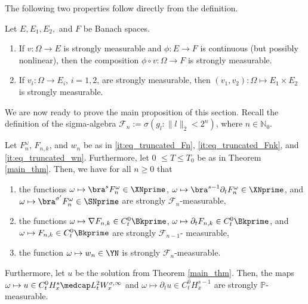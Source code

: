 \documentclass[11pt]{article}
\begin{document}
The following two properties follow directly from the definition. 
\begin{lem}Let \( E,E_1,E_2, \) and \( F \) be Banach spaces. \label{appendix:lem_properties}
\begin{enumerate}[itemsep=0ex]
\item If \( v\colon \Omega \rightarrow E \)  is strongly measurable and \( \phi\colon E \rightarrow F \) is continuous (but possibly nonlinear),  then the composition \( \phi\circ v\colon \Omega \rightarrow F \) is strongly measurable.
\label{appendix:enum_cont} 
\item If \( v_i \colon \Omega \rightarrow E_i \), \( i=1,2 \), are strongly measurable, then \( (v_1,v_2) \colon \Omega \mapsto E_1 \times E_2 \) is strongly measurable. \label{appendix:enum_prod}
\end{enumerate}\vspace{-4ex}
\end{lem}

We are now ready to prove the main proposition of this section. Recall the definition of the sigma-algebra \( \mathscr{F}_n := \sigma( g_l \colon \| l\|_2 < 2^n) \), where \( n\in \mathbb{N}_0 \).
\begin{prop}\label{appendix:prop_measurability}
Let \( F_n^\omega\), \( F_{n,k} \), and \( w_n\) be as in \eqref{it:eq_truncated_Fn}, \eqref{it:eq_truncated_Fnk}, and \eqref{it:eq_truncated_wn}. Furthermore, let 0 \( \leq T \leq T_0 \) be as in Theorem \ref{main_thm}. Then, we have for all \( n \geq 0 \) that 
\begin{enumerate}[itemsep=0ex]
\item the functions \( \omega \mapsto \bra^s F_n^\omega \in \XNprime  \), \( \omega \mapsto \bra^{s-1} \partial_t F_n^\omega \in \XNprime \), and \( \omega \mapsto \bra^{\sigma^\prime} F_n^\omega \in \SNprime \) are strongly \( \mathscr{F}_n \)-measurable, \label{appendix:enum_Fn} 
\item the functions \( \omega \mapsto \nabla F_{n,k} \in C_t^0 \Bkprime \),   \( \omega \mapsto \partial_t F_{n,k} \in C_t^0 \Bkprime \), and  \( \omega \mapsto  F_{n,k} \in C_t^0 \Bkprime \)  are strongly \( \mathscr{F}_{n-1}\)- measurable, \label{appendix:enum_Fnk}
\item the function \( \omega \mapsto w_n \in \YN \) is strongly \( \mathscr{F}_n \)-measurable. \label{appendix:enum_wn}
\end{enumerate}
Furthermore, let \( u \) be the solution from Theorem \ref{main_thm}. Then, the maps \( \omega \mapsto u\in C_t^0 H_x^s \medcap L_t^2 W_x^{\sigma,\infty} \) and \( \omega \mapsto \partial_t u \in C_t^0 H_x^{s-1} \) are strongly \( \mathbb{P}\)-measurable. 
\end{prop}
\end{document}
